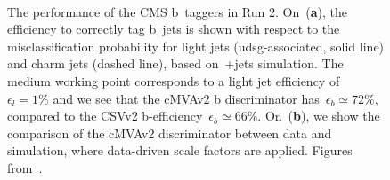 \begin{figure}
\begin{centering}
 \\
\caption[The performance of the CMS b~taggers in Run 2]{The performance of the CMS b~taggers in Run 2. On~(\textbf{a}), the efficiency to correctly tag b~jets is shown with respect to the misclassification probability for light jets (udsg-associated, solid line) and charm jets (dashed line), based on~\ttbar+jets simulation. The medium working point corresponds to a light jet efficiency of $\epsilon_{l} = 1\%$ and we see that the cMVAv2 b discriminator has~$\epsilon_{b} \simeq 72\%$, compared to the CSVv2 b-efficiency~$\epsilon_{b} \simeq 66\%$. On~(\textbf{b}), we show the comparison of the cMVAv2 discriminator between data and simulation, where data-driven scale factors are applied. Figures from~\cite{CMS-PAS-BTV-15-001}.}
\label{fig:btag_roc}
\end{centering}
\end{figure}

